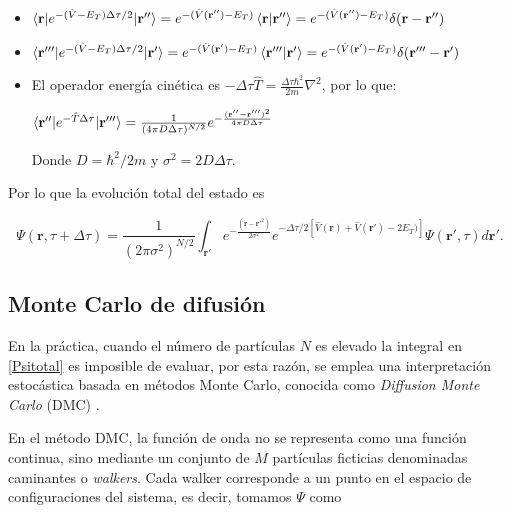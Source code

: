 \documentclass[11pt,a4paper,twoside,pdf]{article}
\numberwithin{equation}{section}
\begin{document}
\begin{itemize}
    \item $\braket{\mathbf{r}| e^{-(\hat{V}-E_T)\Delta \tau/2} | \mathbf{r''}} =  e^{-(\hat{V}(\mathbf{r''})-E_T)} \braket{\mathbf{r|r''}} = e^{-(\hat{V}(\mathbf{r''})-E_T)} \delta(\mathbf{r-r''})$
    \item $ \braket{\mathbf{r'''}|e^{-(\hat{V}-E_T)\Delta \tau/2} | \mathbf{r'}} =  e^{-(\hat{V}(\mathbf{r'})-E_T)} \braket{\mathbf{r'''|r'}} = e^{-(\hat{V}(\mathbf{r'})-E_T)} \delta(\mathbf{r'''-r'})$
    \item El operador energía cinética es $-\Delta \tau \hat{T} = \frac{\Delta \tau \hbar^2}{2m} \nabla^2$, por lo que:
    
    $ \braket{\mathbf{r''}| e^{-\hat{T}\Delta \tau} | \mathbf{r'''}} = \frac{1}{(4\pi D \Delta \tau)^{N/2}} e^{-\frac{(\mathbf{r''} - \mathbf{r'''})^2}{4\pi D \Delta \tau}}$ 

    Donde $D=\hbar^2/2m$ y $\sigma^2 = 2D\Delta \tau$.
    
    
\end{itemize}

Por lo que la evolución total del estado es

\begin{equation}
    \Psi(\mathbf{r}, \tau + \Delta \tau) = \frac{1}{(2\pi \sigma^2)^{N/2}} \int_{\mathbf{r'}} e^{-\frac{(\mathbf{r} - \mathbf{r'}^2)}{2\sigma^2}} e^{-\Delta \tau /2 \left[ \hat{V}(\mathbf{r}) +  \hat{V}(\mathbf{r'}) - 2E_T) \right] } \Psi (\mathbf{r'}, \tau) d \mathbf{r'}.
\label{Psitotal}
\end{equation}




\subsection{Monte Carlo de difusión}
\label{DMC}


En la práctica, cuando el número de partículas $N$ es elevado la integral en \ref{Psitotal} es imposible de evaluar, por esta razón, se emplea una interpretación estocástica basada en métodos Monte Carlo, conocida como \textit{Diffusion Monte Carlo} (DMC) \cite{hammond1994monte}.



En el método DMC, la función de onda no se representa como una función continua, sino mediante un conjunto de $M$ partículas ficticias denominadas caminantes o \textit{walkers}. Cada walker corresponde a un punto en el espacio de configuraciones del sistema, es decir, tomamos $\Psi$ como
\end{document}

